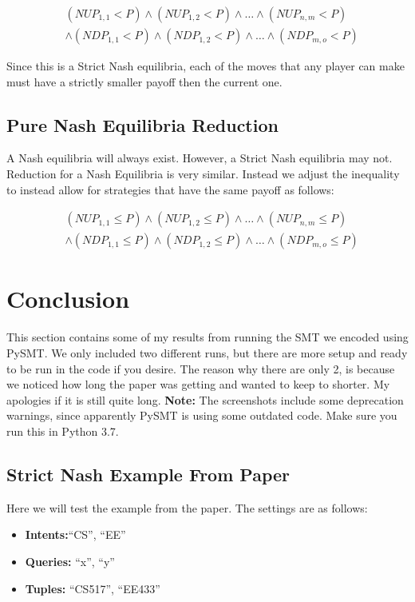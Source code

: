 \documentclass{article}
\begin{document}
\begin{align}
\label{eqn:strictnash}
&(NUP_{1,1} < P) \land (NUP_{1,2} < P) \land \ldots\land (NUP_{n,m} < P)\\
&\land(NDP_{1,1} < P) \land (NDP_{1,2} < P) \land \ldots\land (NDP_{m,o} < P)
\end{align}

Since this is a Strict Nash equilibria, each of the moves that any player can make must have a strictly smaller payoff then the current one.

\subsection{Pure Nash Equilibria Reduction}
\label{sec:nash}
A Nash equilibria will always exist. However, a Strict Nash equilibria may not. Reduction for a Nash Equilibria is very similar. Instead we adjust the inequality to instead allow for strategies that have the same payoff as follows:

\begin{align}
\label{eqn:nash}
&(NUP_{1,1} \le P) \land (NUP_{1,2}\le P) \land \ldots\land (NUP_{n,m} \le P)\\
&\land(NDP_{1,1} \le P) \land (NDP_{1,2} \le P) \land \ldots\land (NDP_{m,o} \le P)
\end{align}

\section{Conclusion}
This section contains some of my results from running the SMT we encoded using PySMT. We only included two different runs, but there are more setup and ready to be run in the code if you desire. The reason why there are only 2, is because we noticed how long the paper was getting and wanted to keep to shorter. My apologies if it is still quite long. \textbf{Note:} The screenshots include some deprecation warnings, since apparently PySMT is using some outdated code. Make sure you run this in Python 3.7. 

\subsection{Strict Nash Example From Paper}
Here we will test the example from the paper. The settings are as follows:

\begin{itemize}[noitemsep]
    \item \textbf{Intents:}``CS'', ``EE''
    \item \textbf{Queries:} ``x'', ``y''
    \item \textbf{Tuples:} ``CS517'', ``EE433''
\end{itemize}
\end{document}
